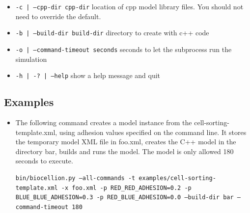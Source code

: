 \documentclass{article}
\newcommand{\inlinecode}[1]{\texttt{#1}}
\begin{document}
\begin{itemize}
\item \inlinecode{-c | --cpp-dir cpp-dir}
  location of cpp model library files.  You should not need to override the default.
\item \inlinecode{-b | --build-dir build-dir}
  directory to create with c++ code
\item \inlinecode{-o | --command-timeout seconds}
  seconds to let the subprocess run the simulation
\item \inlinecode{-h | -? | --help}
  show a help message and quit
\end{itemize}

\subsection{Examples}

\begin{itemize}

\item The following command creates a model instance from the cell-sorting-template.xml, using adhesion values specified on the command line.  It stores the temporary
  model XML file in foo.xml, creates the C++ model in the directory bar, builds and runs the model.  The model is only allowed 180 seconds to execute.

  \inlinecode{bin/biocellion.py --all-commands -t examples/cell-sorting-template.xml -x foo.xml -p RED\_RED\_ADHESION=0.2 -p BLUE\_BLUE\_ADHESION=0.3 -p RED\_BLUE\_ADHESION=0.0 --build-dir bar --command-timeout 180}
  
\end{itemize}
\end{document}
